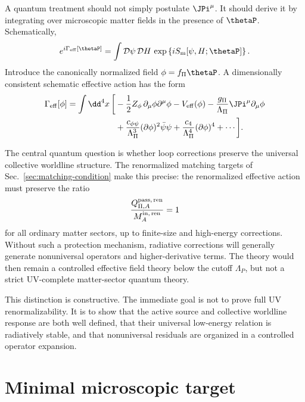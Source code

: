 \documentclass[12pt]{article}
\begin{document}
A quantum treatment should not simply postulate \(\JPi^\mu\). It should derive it by integrating over microscopic matter fields in the presence of \(\thetaP\). Schematically,
\begin{equation}
    e^{i\Gamma_{\rm eff}[\thetaP]}
    =\int \mathcal{D}\psi\,\mathcal{D}H\,
    \exp\left\{iS_{\rm m}[\psi,H;\thetaP]\right\}.
    \label{eq:effective-action}
\end{equation}
Introduce the canonically normalized field \(\phi=f_\Pi\thetaP\).  A dimensionally consistent schematic effective action has the form
\begin{equation}
\begin{aligned}
    \Gamma_{\rm eff}[\phi]
    =\int \dd^4x\,\bigg[&
    -\frac{1}{2}Z_\phi\,\partial_\mu\phi\partial^\mu\phi
    -V_{\rm eff}(\phi)
    -\frac{g_\Pi}{\Lambda_\Pi}\JPi^\mu\partial_\mu\phi \\
    &+\frac{c_{\phi\psi}}{\Lambda_\Pi^3}
       (\partial\phi)^2\bar\psi\psi
    +\frac{c_{4}}{\Lambda_\Pi^4}(\partial\phi)^4
    +\cdots\bigg].
\end{aligned}
\label{eq:Gamma-eff-expansion}
\end{equation}

The central quantum question is whether loop corrections preserve the universal collective worldline structure. The renormalized matching targets of Sec.~\ref{sec:matching-condition} make this precise: the renormalized effective action must preserve the ratio
\begin{equation}
    \frac{Q_{\Pi,A}^{{\rm pass},\,\rm ren}}{M_A^{{\rm in},\,\rm ren}}=1
    \label{eq:matching-universal}
\end{equation}
for all ordinary matter sectors, up to finite-size and high-energy corrections. Without such a protection mechanism, radiative corrections will generally generate nonuniversal operators and higher-derivative terms. The theory would then remain a controlled effective field theory below the cutoff \(\Lambda_P\), but not a strict UV-complete matter-sector quantum theory.

This distinction is constructive. The immediate goal is not to prove full UV renormalizability. It is to show that the active source and collective worldline response are both well defined, that their universal low-energy relation is radiatively stable, and that nonuniversal residuals are organized in a controlled operator expansion.
\section{Minimal microscopic target}
\end{document}
